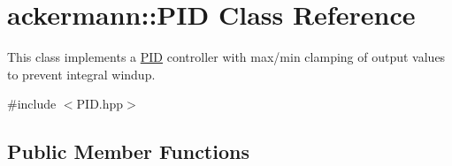 \hypertarget{classackermann_1_1_p_i_d}{}\section{ackermann\+:\+:P\+ID Class Reference}
\label{classackermann_1_1_p_i_d}


This class implements a \hyperlink{classackermann_1_1_p_i_d}{P\+ID} controller with max/min clamping of output values to prevent integral windup.  




{\ttfamily \#include $<$P\+I\+D.\+hpp$>$}

\subsection*{Public Member Functions}
